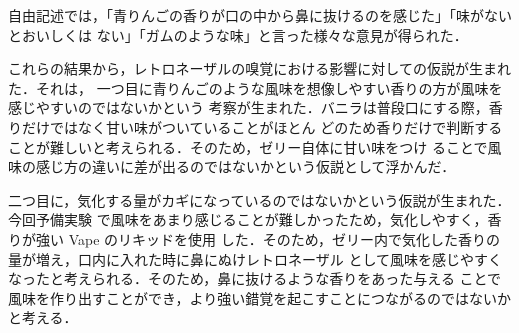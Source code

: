 自由記述では，「青りんごの香りが口の中から鼻に抜けるのを感じた」「味がないとおいしくは
ない」「ガムのような味」と言った様々な意見が得られた．


これらの結果から，レトロネーザルの嗅覚における影響に対しての仮説が生まれた．それは，
一つ目に青りんごのような風味を想像しやすい香りの方が風味を感じやすいのではないかという
考察が生まれた．バニラは普段口にする際，香りだけではなく甘い味がついていることがほとん
どのため香りだけで判断することが難しいと考えられる．そのため，ゼリー自体に甘い味をつけ
ることで風味の感じ方の違いに差が出るのではないかという仮説として浮かんだ．


二つ目に，気化する量がカギになっているのではないかという仮説が生まれた．今回予備実験
で風味をあまり感じることが難しかったため，気化しやすく，香りが強い Vape のリキッドを使用
した．そのため，ゼリー内で気化した香りの量が増え，口内に入れた時に鼻にぬけレトロネーザル
として風味を感じやすくなったと考えられる．そのため，鼻に抜けるような香りをあった与える
ことで風味を作り出すことができ，より強い錯覚を起こすことにつながるのではないかと考える．